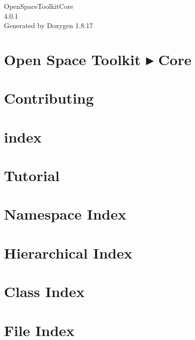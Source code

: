\let\mypdfximage\pdfximage\def\pdfximage{\immediate\mypdfximage}\documentclass[twoside]{book}
\newcommand{\+}{\discretionary{\mbox{\scriptsize$\hookleftarrow$}}{}{}}
\newcommand{\clearemptydoublepage}{%
  \newpage{\pagestyle{empty}\cleardoublepage}%
}
\begin{document}
\hypersetup{pageanchor=false,
             bookmarksnumbered=true,
             pdfencoding=unicode
            }
\begin{titlepage}
\vspace*{7cm}
\begin{center}%
{\Large Open\+Space\+Toolkit\+Core \\[1ex]\large 4.\+0.\+1 }\\
\vspace*{1cm}
{\large Generated by Doxygen 1.8.17}\\
\end{center}
\end{titlepage}
\clearemptydoublepage
{}
\tableofcontents
\clearemptydoublepage
{}
\hypersetup{pageanchor=true}

\chapter{Open Space Toolkit ▸ Core}
\label{index}\hypertarget{index}{}
\chapter{Contributing}
\label{md__c_o_n_t_r_i_b_u_t_i_n_g}

\chapter{index}
\label{md_docs_index}

\chapter{Tutorial}
\label{md_docs__tutorial}

\chapter{Namespace Index}

\chapter{Hierarchical Index}

\chapter{Class Index}

\chapter{File Index}

\end{document}
